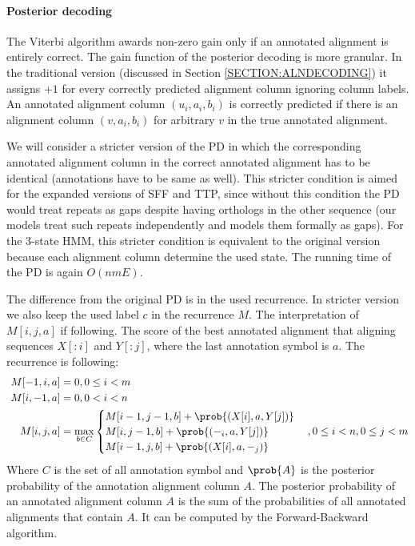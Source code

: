 \paragraph{Posterior decoding}
The Viterbi algorithm awards non-zero gain only if an annotated alignment is
entirely correct. The gain function of the posterior decoding is more granular.
In the traditional version (discussed in Section \ref{SECTION:ALNDECODING}) it
assigns $+1$ for every correctly predicted alignment column ignoring column
labels. An annotated alignment column $(u_i, a_i, b_i)$ is correctly predicted
if there is an alignment column $(v, a_i, b_i)$ for arbitrary $v$ in the true
annotated alignment. 

We will consider a stricter version of the PD in which the corresponding
annotated alignment column in the correct annotated alignment has to be
identical (annotations have to be same as well). This stricter condition is
aimed for the expanded versions of SFF and TTP, since without this condition
the PD would treat repeats as gaps despite having orthologs in the other
sequence (our models treat such repeats independently and models them formally
as gaps). For the 3-state HMM, this stricter condition is equivalent to the
original version because each alignment column determine the used state.
The running time of the PD is again $O(nmE)$. 

The difference from the original PD is in the used recurrence. In stricter
version we also keep the used label $c$ in the recurrence $M$. The
interpretation of $M[i,j,a]$ if following.  The score of the best annotated
alignment that aligning sequences $X[:i]$ and $Y[:j]$, where the last
annotation symbol is $a$. The recurrence is following:
\begin{align} 
M[-1,i,a] &= 0, 0\leq i < m\\\
M[i,-1,a] &= 0, 0< i < n\\
M[i,j,a] &= \max_{b\in C}
\begin{cases}
 M[i-1,j-1,b]+\prob{(X[i],a, Y[j])}\\
 M[i,j-1,b]+\prob{(-_{i},a, Y[j])}\\
 M[i-1,j,b]+\prob{(X[i],a, -_{j})}
\end{cases}, 0\leq i<n,0\leq j<m 
\end{align}
Where $C$ is the set of all annotation symbol and $\prob{A}$ is the posterior
probability of the annotation alignment column $A$. The posterior probability
of an annotated alignment column $A$ is the sum of the probabilities of all
annotated alignments that contain $A$. It can be computed by the
Forward-Backward algorithm.

